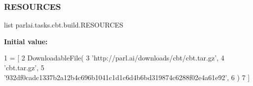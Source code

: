 \subsubsection{\texorpdfstring{R\+E\+S\+O\+U\+R\+C\+ES}{RESOURCES}}
{\footnotesize\ttfamily list parlai.\+tasks.\+cbt.\+build.\+R\+E\+S\+O\+U\+R\+C\+ES}

{\bfseries Initial value\+:}
\begin{DoxyCode}
1 =  [
2     DownloadableFile(
3         \textcolor{stringliteral}{'http://parl.ai/downloads/cbt/cbt.tar.gz'},
4         \textcolor{stringliteral}{'cbt.tar.gz'},
5         \textcolor{stringliteral}{'932df0cadc1337b2a12b4c696b1041c1d1c6d4b6bd319874c6288f02e4a61e92'},
6     )
7 ]
\end{DoxyCode}
